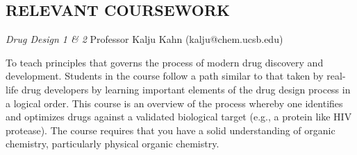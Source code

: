 \documentclass[margin, 10pt]{res} %
\begin{document}
\begin{resume}
\section{RELEVANT COURSEWORK}
{\sl Drug Design 1 \& 2} \hfill Professor Kalju Kahn  (kalju@chem.ucsb.edu)

To teach principles that governs the process of modern drug discovery and development. Students in the course follow a path similar to that taken by real-life drug developers by learning important elements of the drug design process in a logical order.
This course is an overview of the process whereby one identifies and optimizes drugs against a validated biological target (e.g., a protein like HIV protease). The course requires that you have a solid understanding of organic chemistry, particularly physical organic chemistry.

\end{resume}
\end{document}
